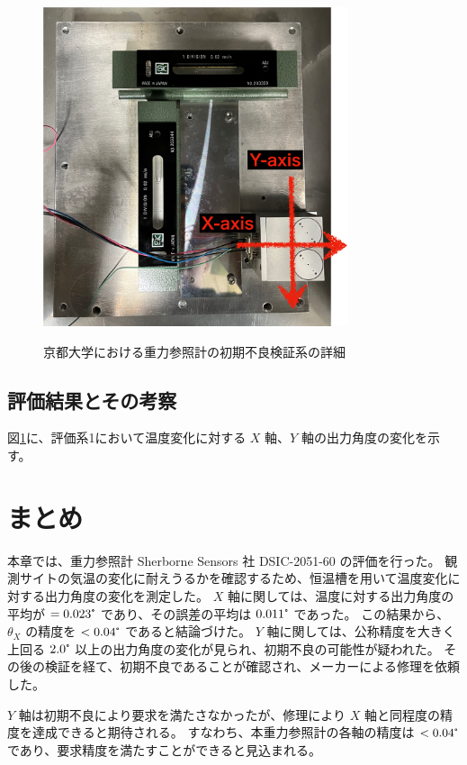 \documentclass[../../main.tex]{subfiles}
\begin{document}
\begin{figure}[H]
    \begin{minipage}[b]{0.45\columnwidth}
        \centering
        \includegraphics[width=0.8\textwidth]{tiltsensor/evalu_kyoto3.pdf}
        \subcaption{}
        \label{fig:evaluation_kyoto3}
    \end{minipage}
    \caption{京都大学における重力参照計の初期不良検証系の詳細}
    \label{aaa}
\end{figure}
\subsection{評価結果とその考察}
図\ref{}に、評価系1において温度変化に対する $X$ 軸、$Y$ 軸の出力角度の変化を示す。
\section{まとめ}
本章では、重力参照計 Sherborne Sensors 社 DSIC-2051-60 の評価を行った。
観測サイトの気温の変化に耐えうるかを確認するため、恒温槽を用いて温度変化に対する出力角度の変化を測定した。
$X$ 軸に関しては、温度に対する出力角度の平均が $=0.023\tcdegree$ であり、その誤差の平均は $0.011\tcdegree$ であった。
この結果から、 $\theta_{X}$ の精度を $<0.04\tcdegree$ であると結論づけた。
$Y$ 軸に関しては、公称精度を大きく上回る $2.0\tcdegree$ 以上の出力角度の変化が見られ、初期不良の可能性が疑われた。
その後の検証を経て、初期不良であることが確認され、メーカーによる修理を依頼した。

$Y$ 軸は初期不良により要求を満たさなかったが、修理により $X$ 軸と同程度の精度を達成できると期待される。
すなわち、本重力参照計の各軸の精度は $<0.04\tcdegree$ であり、要求精度を満たすことができると見込まれる。
\end{document}

